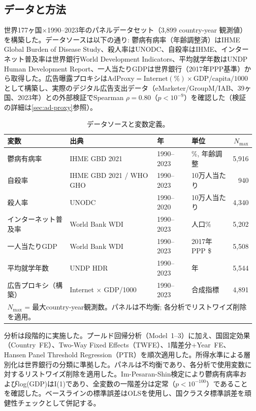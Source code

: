 \documentclass[a4paper,11pt,titlepage]{article}
\begin{document}
\subsection{データと方法}\label{sec:data}

世界177ヶ国$\times$1990--2023年のパネルデータセット（3,899 country-year 観測値）を構築した。データソースは以下の通り: 鬱病有病率（年齢調整済）はIHME Global Burden of Disease Study、殺人率はUNODC、自殺率はIHME、インターネット普及率は世界銀行World Development Indicators、平均就学年数はUNDP Human Development Report、一人当たりGDPは世界銀行（2017年PPP基準）から取得した。広告曝露プロキシは$\text{AdProxy} = \text{Internet}(\%) \times \text{GDP/capita} / 1000$として構築し、実際のデジタル広告支出データ（eMarketer/GroupM/IAB、39ヶ国、2023年）との外部検証でSpearman $\rho = 0.80$（$p < 10^{-9}$）を確認した（検証の詳細は\cref{sec:ad-proxy}参照）。

\begin{table}[htbp]
\centering
\caption{データソースと変数定義。}
\label{tab:data-sources}
\small
\begin{tabular}{llllr}
\toprule
変数 & 出典 & 年 & 単位 & $N_{\max}$ \\
\midrule
鬱病有病率 & IHME GBD 2021 & 1990--2023 & \%, 年齢調整 & 5,916 \\
自殺率 & IHME GBD 2021 / WHO GHO & 1990--2023 & 10万人当たり & 940 \\
殺人率 & UNODC & 1990--2020 & 10万人当たり & 4,340 \\
インターネット普及率 & World Bank WDI & 1990--2023 & 人口\% & 5,202 \\
一人当たりGDP & World Bank WDI & 1990--2023 & 2017年PPP \$ & 5,508 \\
平均就学年数 & UNDP HDR & 1990--2023 & 年 & 5,544 \\
広告プロキシ（構築） & Internet $\times$ GDP/1000 & 1990--2023 & 合成指標 & 4,891 \\
\bottomrule
\multicolumn{5}{l}{\scriptsize $N_{\max}$ = 最大country-year観測数。パネルは不均衡; 各分析でリストワイズ削除を適用。}
\end{tabular}
\end{table}

分析は段階的に実施した。プールド回帰分析（Model~1--3）に加え、国固定効果（Country~FE）、Two-Way Fixed Effects（TWFE）、1階差分+Year~FE、Hansen Panel Threshold Regression（PTR）を順次適用した。所得水準による層別化は世界銀行の分類に準拠した。パネルは不均衡であり、各分析で使用変数に対するリストワイズ削除を適用した。Im-Pesaran-Shin検定により鬱病有病率およびlog(GDP)はI(1)であり、全変数の一階差分は定常（$p < 10^{-100}$）であることを確認した。ベースラインの標準誤差はOLSを使用し、国クラスタ標準誤差を頑健性チェックとして併記する。
\end{document}
